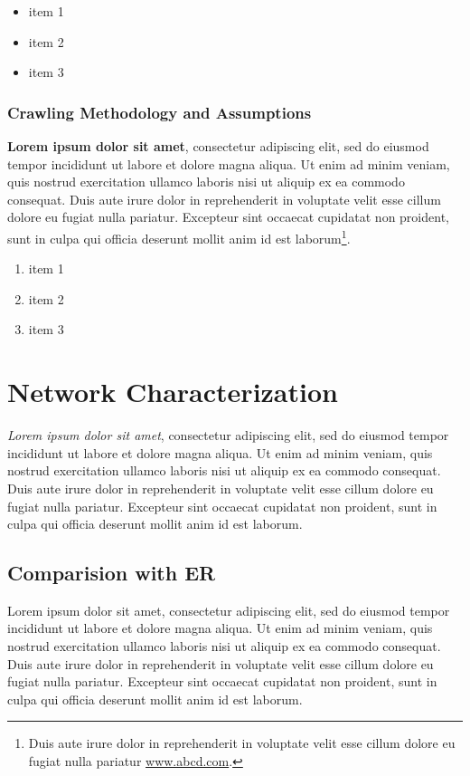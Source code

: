 \documentclass[sigchi]{acmart}
\begin{document}
\begin{itemize}
\item item 1
\item item 2
\item item 3
\end{itemize}

\subsubsection{Crawling Methodology and Assumptions}

{\bf Lorem ipsum dolor sit amet}, consectetur adipiscing elit, sed do eiusmod tempor incididunt ut labore et dolore magna aliqua. Ut enim ad minim veniam, quis nostrud exercitation ullamco laboris nisi ut aliquip ex ea commodo consequat. Duis aute irure dolor in reprehenderit in voluptate velit esse cillum dolore eu fugiat nulla pariatur. Excepteur sint occaecat cupidatat non proident, sunt in culpa qui officia deserunt mollit anim id est laborum\footnote{Duis aute irure dolor in reprehenderit in voluptate velit esse cillum dolore eu fugiat nulla pariatur \url{www.abcd.com}.}.

\begin{enumerate}
\item item 1
\item item 2
\item item 3
\end{enumerate}

\section{Network Characterization}

{\em Lorem ipsum dolor sit amet}, consectetur adipiscing elit, sed do eiusmod tempor incididunt ut labore et dolore magna aliqua. Ut enim ad minim veniam, quis nostrud exercitation ullamco laboris nisi ut aliquip ex ea commodo consequat. Duis aute irure dolor in reprehenderit in voluptate velit esse cillum dolore eu fugiat nulla pariatur. Excepteur sint occaecat cupidatat non proident, sunt in culpa qui officia deserunt mollit anim id est laborum.

\subsection{Comparision with ER}

Lorem ipsum dolor sit amet, consectetur adipiscing elit, sed do eiusmod tempor incididunt ut labore et dolore magna aliqua. Ut enim ad minim veniam, quis nostrud exercitation ullamco laboris nisi ut aliquip ex ea commodo consequat. Duis aute irure dolor in reprehenderit in voluptate velit esse cillum dolore eu fugiat nulla pariatur. Excepteur sint occaecat cupidatat non proident, sunt in culpa qui officia deserunt mollit anim id est laborum.
\end{document}
